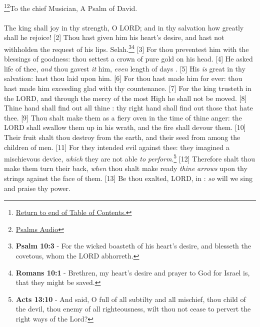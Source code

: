 \footnote{\textcolor[cmyk]{0.99998,1,0,0}{\hyperlink{TOC}{Return to end of Table of Contents.}}}\footnote{\href{https://www.audioverse.org/english/audiobibles/books/ENGKJV/O/Ps/1}{\textcolor[cmyk]{0.99998,1,0,0}{Psalms Audio}}}\textcolor[cmyk]{0.99998,1,0,0}{To the chief Musician, A Psalm of David.}\\
\\
\textcolor[cmyk]{0.99998,1,0,0}{The king shall joy in thy strength, O LORD; and in thy salvation how greatly shall he rejoice!}
[2] \textcolor[cmyk]{0.99998,1,0,0}{Thou hast given him his heart's desire, and hast not withholden the request of his lips. Selah.}\footnote{\textbf{Psalm 10:3} - For the wicked boasteth of his heart’s desire, and blesseth the covetous, whom the LORD abhorreth.}\footnote{\textbf{Romans 10:1} - Brethren, my heart’s desire and prayer to God for Israel is, that they might be saved.}
[3] \textcolor[cmyk]{0.99998,1,0,0}{For thou preventest him with the blessings of goodness: thou settest a crown of pure gold on his head.}
[4] \textcolor[cmyk]{0.99998,1,0,0}{He asked life of thee, \emph{and} thou gavest \emph{it} him, \emph{even} length of days .}
[5] \textcolor[cmyk]{0.99998,1,0,0}{His  \emph{is} great in thy salvation:   hast thou laid upon him.}
[6] \textcolor[cmyk]{0.99998,1,0,0}{For thou hast made him  for ever: thou hast made him exceeding glad with thy countenance.}
[7] \textcolor[cmyk]{0.99998,1,0,0}{For the king trusteth in the LORD, and through the mercy of the most High he shall not be moved.}
[8] \textcolor[cmyk]{0.99998,1,0,0}{Thine hand shall find out all thine : thy right hand shall find out those that hate thee.}
[9] \textcolor[cmyk]{0.99998,1,0,0}{Thou shalt make them as a fiery oven in the time of thine anger: the LORD shall swallow them up in his wrath, and the fire shall devour them.}
[10] \textcolor[cmyk]{0.99998,1,0,0}{Their fruit shalt thou destroy from the earth, and their seed from among the children of men.}
[11] \textcolor[cmyk]{0.99998,1,0,0}{For they intended evil against thee: they imagined a mischievous device, \emph{which} they are not able \emph{to} \emph{perform}.}\footnote{\textbf{Acts 13:10} - And said, O full of all subtilty and all mischief, thou child of the devil, thou enemy of all righteousness, wilt thou not cease to pervert the right ways of the Lord?}
[12] \textcolor[cmyk]{0.99998,1,0,0}{Therefore shalt thou make them turn their back, \emph{when} thou shalt make ready \emph{thine} \emph{arrows} upon thy strings against the face of them.}
[13] \textcolor[cmyk]{0.99998,1,0,0}{Be thou exalted, LORD, in : \emph{so} will we sing and praise thy power.}


